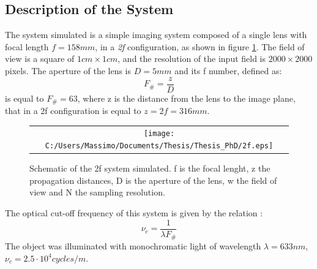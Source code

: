 	 \subsection{Description of the System}
	 \label{sec:system}
	 The system simulated is a simple imaging system composed of a single lens with focal length $f=158mm$, in a \textit{2f} configuration, as shown in figure \ref{fig:2f}. The field of view is a square of $1cm \times 1cm$, and the resolution of the input field is $2000 \times 2000$ pixels. The aperture of the lens is $D=5mm$ and its f number, defined as:
	 \begin{equation}
	 \label{eq:fnum}
		F_{\#}=\dfrac{z}{D}
	 \end{equation}
	 is equal to $F_{\#}=63$, where z is the distance from the lens to the image plane, that in a 2f configuration is equal to $z=2f=316mm$.
	 \begin{figure}[h]
	 	\begin{center}
	 		\begin{tabular}{c}
	 			\texttt{[image: C:/Users/Massimo/Documents/Thesis/Thesis\_PhD/2f.eps]}
	 		\end{tabular}
	 	\end{center}
	 	\caption{ \label{fig:2f} 
	 		Schematic of the 2f system simulated. f is the focal lenght, z the propagation distances, D is the aperture of the lens, w the field of view and N the sampling resolution. }
	 \end{figure} 
	 The optical cut-off frequency of this system is given by the relation \cite{goodman2005introduction}:
	 \begin{equation}
	 \label{eq:cutoff}
	 \nu_c=\dfrac{1}{\lambda F_{\#}}
	 \end{equation} 
	 The object was illuminated with monochromatic light of wavelength $\lambda=633nm$, $\nu_c=2.5\cdot10^4 cycles/m$.
